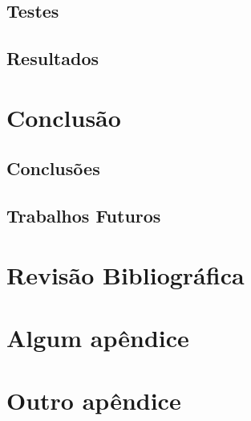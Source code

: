 \documentclass{ufpatcc}
\begin{document}
		\section{Testes}

		\section{Resultados}
		

  \chapter{Conclusão}

		\section{Conclusões}

		\section{Trabalhos Futuros}

  \chapter{Revisão Bibliográfica}
    \lipsum[2]\cite{atalhoonline}


  \appendix
    \chapter{Algum apêndice}
    \chapter{Outro apêndice}

  
\end{document}
